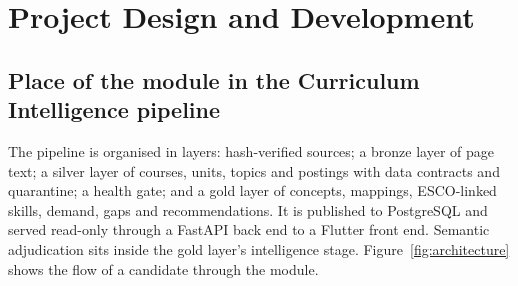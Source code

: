 \section{Project Design and Development}
\label{sec:projectdesign}

\subsection{Place of the module in the Curriculum Intelligence pipeline}

The pipeline is organised in layers: hash-verified sources; a bronze layer of page text; a silver layer of courses, units, topics and postings with data contracts and quarantine; a health gate; and a gold layer of concepts, mappings, ESCO-linked skills, demand, gaps and recommendations. It is published to PostgreSQL and served read-only through a FastAPI back end to a Flutter front end. Semantic adjudication sits inside the gold layer's intelligence stage. Figure~\ref{fig:architecture} shows the flow of a candidate through the module.

